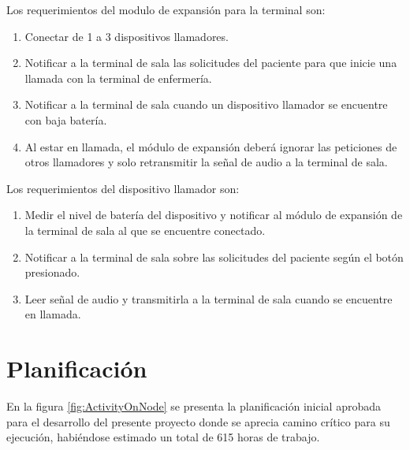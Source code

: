 Los requerimientos del  modulo de expansión para la terminal son:

\begin{enumerate}

\item Conectar de 1 a 3 dispositivos llamadores.

\item Notificar a la terminal de sala las solicitudes del paciente para que inicie una llamada con la terminal de enfermería.

\item Notificar a la terminal de sala cuando un dispositivo llamador se encuentre con baja batería.

\item Al estar en llamada, el módulo de expansión deberá ignorar las peticiones de otros llamadores y solo retransmitir la señal de audio a la terminal de sala.

\end{enumerate}

Los requerimientos del dispositivo llamador son:

\begin{enumerate}

\item Medir el nivel de batería del dispositivo y notificar al módulo de expansión de la terminal de sala al que se encuentre conectado.

\item Notificar a la terminal de sala sobre las solicitudes del paciente según el botón presionado.

\item Leer señal de audio y transmitirla a la terminal de sala cuando se encuentre en llamada.

\end{enumerate}

\section{Planificación}

En la figura \ref{fig:ActivityOnNode} se presenta la planificación inicial aprobada para el desarrollo del presente proyecto donde se aprecia camino crítico para su ejecución, habiéndose estimado un total de 615 horas de trabajo.


